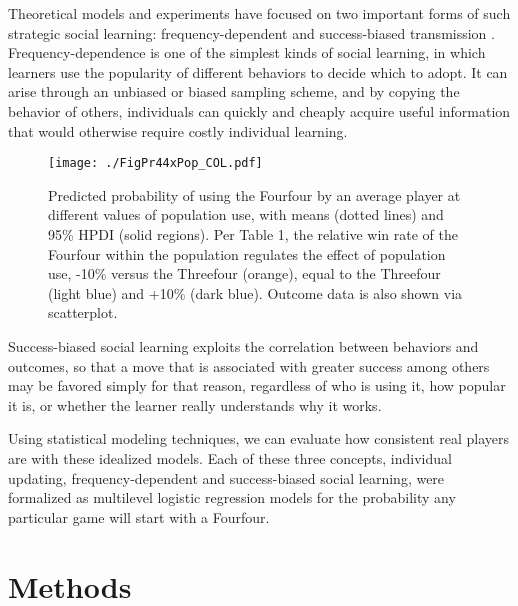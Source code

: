 \documentclass[reqno,12pt]{amsart}
\begin{document}
Theoretical models and experiments have focused on two important forms
of such strategic social learning: frequency-dependent and
success-biased transmission
\citep{boyd1985culture, McElreathetalSuccessbias2008}.
Frequency-dependence is one of the simplest kinds of social learning, in
which learners use the popularity of different behaviors to decide which
to adopt. It can arise through an unbiased or biased sampling scheme,
and by copying the behavior of others, individuals can quickly and
cheaply acquire useful information that would otherwise require costly
individual learning.

\begin{figure}[t]
  \begin{center}
    \texttt{[image: ./FigPr44xPop\_COL.pdf]}
    \caption{Predicted probability of using the Fourfour by an average player at different values of population use, with means (dotted lines) and 95\% HPDI (solid regions). Per Table 1, the relative win rate of the Fourfour within the population regulates the effect of population use, -10\% versus the Threefour (orange), equal to the Threefour (light blue) and +10\% (dark blue). Outcome data is also shown via scatterplot.}
    \label{FigPr44}
  \end{center}
\end{figure}

Success-biased social learning exploits the correlation between
behaviors and outcomes, so that a move that is associated with greater
success among others may be favored simply for that reason, regardless
of who is using it, how popular it is, or whether the learner really
understands why it works.

Using statistical modeling techniques, we can evaluate how consistent
real players are with these idealized models. Each of these three
concepts, individual updating, frequency-dependent and success-biased
social learning, were formalized as multilevel logistic regression
models for the probability any particular game will start with a
Fourfour.

\section{Methods}\label{methods}
\end{document}

